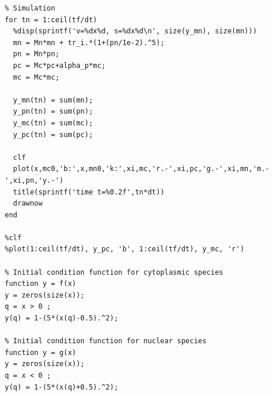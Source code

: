 \documentclass{bioinfo}
\begin{document}
\begin{verbatim}
% Simulation
for tn = 1:ceil(tf/dt)
  %disp(sprintf('v=%dx%d, s=%dx%d\n', size(y_mn), size(mn)))
  mn = Mn*mn + tr_i.*(1+(pn/1e-2).^5); 
  pn = Mn*pn;
  pc = Mc*pc+alpha_p*mc;
  mc = Mc*mc;
  
  y_mn(tn) = sum(mn);
  y_pn(tn) = sum(pn);
  y_mc(tn) = sum(mc);
  y_pc(tn) = sum(pc);
  
  clf
  plot(x,mc0,'b:',x,mn0,'k:',xi,mc,'r.-',xi,pc,'g.-',xi,mn,'m.-',xi,pn,'y.-')
  title(sprintf('time t=%0.2f',tn*dt))
  drawnow
end

%clf
%plot(1:ceil(tf/dt), y_pc, 'b', 1:ceil(tf/dt), y_mc, 'r')

% Initial condition function for cytoplasmic species
function y = f(x)
y = zeros(size(x));
q = x > 0 ;
y(q) = 1-(5*(x(q)-0.5).^2);

% Initial condition function for nuclear species
function y = g(x)
y = zeros(size(x));
q = x < 0 ;
y(q) = 1-(5*(x(q)+0.5).^2);
\end{verbatim}
\end{document}
